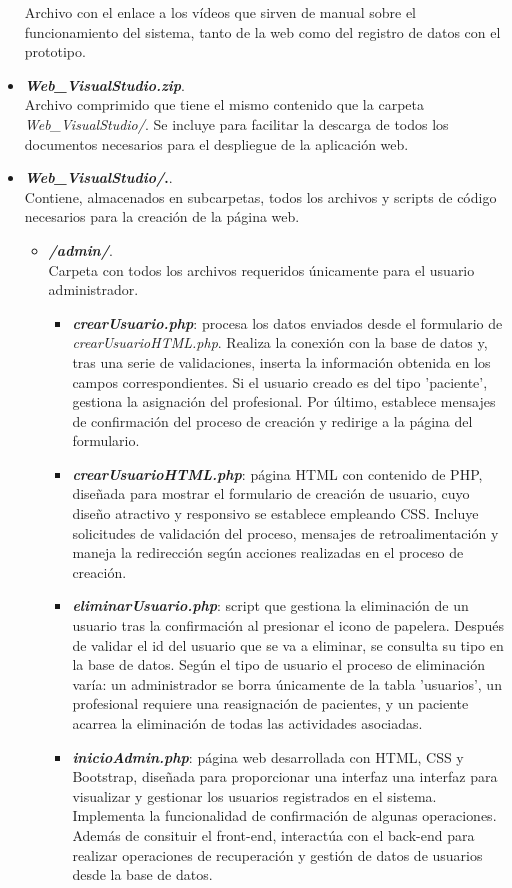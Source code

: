 \begin{itemize}
    Archivo con el enlace a los vídeos que sirven de manual sobre el funcionamiento del sistema, tanto de la web como del registro de datos con el prototipo.
    \item \textbf{\textit{Web\_VisualStudio.zip}}.\\ 
    Archivo comprimido que tiene el mismo contenido que la carpeta \textit{Web\_VisualStudio/}. Se incluye para facilitar la descarga de todos los documentos necesarios para el despliegue de la aplicación web.
    \item \textbf{\textit{Web\_VisualStudio/}.}.\\ 
    Contiene, almacenados en subcarpetas, todos los archivos y scripts de código necesarios para la creación de la página web.
    \begin{itemize}
        \item \textbf{\textit{/admin/}}.\\
        Carpeta con todos los archivos requeridos únicamente para el usuario administrador.
        \begin{itemize}
            \item \textbf{\textit{crearUsuario.php}}: procesa los datos enviados desde el formulario de \textit{crearUsuarioHTML.php}. Realiza la conexión con la base de datos y, tras una serie de validaciones, inserta la información obtenida en los campos correspondientes. Si el usuario creado es del tipo 'paciente', gestiona la asignación del profesional. Por último, establece mensajes de confirmación del proceso de creación y redirige a la página del formulario.
            \item \textbf{\textit{crearUsuarioHTML.php}}: página HTML con contenido de PHP, diseñada para mostrar el formulario de creación de usuario, cuyo diseño atractivo y responsivo se establece empleando CSS. Incluye solicitudes de validación del proceso, mensajes de retroalimentación y maneja la redirección según acciones realizadas en el proceso de creación.
            \item \textbf{\textit{eliminarUsuario.php}}: script que gestiona la eliminación de un usuario tras la confirmación al presionar el icono de papelera. Después de validar el id del usuario que se va a eliminar, se consulta su tipo en la base de datos. Según el tipo de usuario el proceso de eliminación varía: un administrador se borra únicamente de la tabla 'usuarios', un profesional requiere una reasignación de pacientes, y un paciente acarrea la eliminación de todas las actividades asociadas.
            \item \textbf{\textit{inicioAdmin.php}}: página web desarrollada con HTML, CSS y Bootstrap, diseñada para proporcionar una interfaz una interfaz para visualizar y gestionar los usuarios registrados en el sistema. Implementa la funcionalidad de confirmación de algunas operaciones. Además de consituir el front-end, interactúa con el back-end para realizar operaciones de recuperación y gestión de datos de usuarios desde la base de datos.

\end{itemize}
\end{itemize}
\end{itemize}
